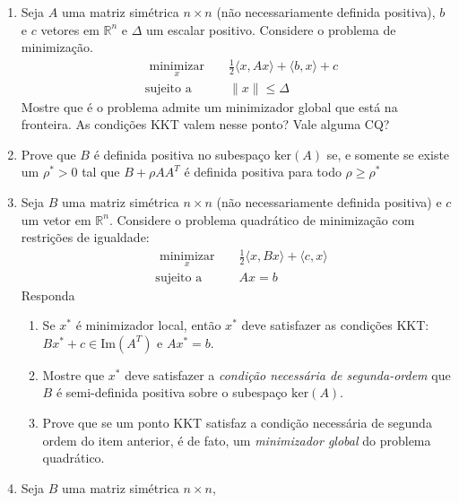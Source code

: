 \documentclass[a4paper,latin]{article}
\begin{document}
\begin{enumerate}
\begin{enumerate}
    \end{enumerate}
     \item Seja $A$ uma matriz simétrica $n \times n$ (não necessariamente definida positiva), $b$ e $c$ vetores em $\mathbb{R}^{n}$ e $\Delta$ um escalar positivo.
    Considere o problema de minimização.  
    \begin{equation*}
    \begin{aligned}
    & \underset{x}{\text{ minimizar }}
    & & \frac{1}{2}\langle x, Ax \rangle+\langle b, x \rangle +c \\
    & \text{sujeito a }
    & & \|x\|\leq \Delta
    \end{aligned}
    \end{equation*}
    Mostre que é o problema admite um minimizador global que está na fronteira. As condições KKT valem nesse ponto? Vale alguma CQ?
    \item Prove que 
    $B$ é definida positiva no subespaço 
    $\text{ker}(A)$
    se, e somente se 
    existe um $\rho^{*}>0$ tal que 
    $B+\rho AA^{T}$ é definida positiva para todo 
    $\rho \geq \rho^*$ 
    \item Seja $B$ uma matriz simétrica $n \times n$ (não necessariamente definida positiva) e $c$ um vetor em $\mathbb{R}^{n}$.
    Considere o problema quadrático de minimização com restrições de igualdade:  
    \begin{equation*}
    \begin{aligned}
    & \underset{x}{\text{ minimizar }}
    & & \frac{1}{2}\langle x, Bx \rangle+\langle c, x \rangle \\
    & \text{sujeito a }
    & & Ax=b
    \end{aligned}
    \end{equation*}
     Responda
    \begin{enumerate}
      \item
      Se $x^*$ é minimizador local, então 
      $x^*$ deve satisfazer as condições KKT: 
      $Bx^*+c \in 
      \text{Im}(A^T)$
      e 
      $Ax^*=b$.
      \item Mostre que $x^*$ deve satisfazer a {\it condição necessária de segunda-ordem } que 
      $B$ é semi-definida positiva sobre o subespaço 
     $\text{ker}(A)$. \item Prove que se um ponto KKT satisfaz a condição necessária de segunda ordem 
     do item anterior, é de fato, um {\it minimizador global } do problema quadrático.
    \end{enumerate}
    \item Seja $B$ uma matriz simétrica $n \times n$, 

\end{enumerate}
\end{document}
